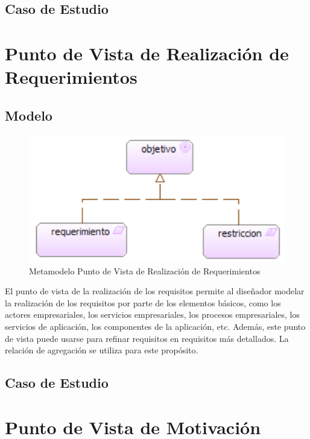 \subsection{Caso de Estudio}

\newpage

\section{Punto de Vista de Realización de Requerimientos}

\subsection{Modelo}

\begin{figure}[th!]
	\centering
	\includegraphics[width=0.5\linewidth]{arquitectura/imagenes/modeloRealizacionRequerimientos}
	\caption{Metamodelo Punto de Vista de Realización de Requerimientos}
	\label{metamodelo realizacion requerimientos}
\end{figure}
El punto de vista de la realización de los requisitos permite al diseñador modelar la realización de los requisitos por parte de los elementos básicos, como los actores empresariales, los servicios empresariales, los procesos empresariales, los servicios de aplicación, los componentes de la aplicación, etc.
Además, este punto de vista puede usarse para refinar requisitos en requisitos más detallados. La relación de agregación se utiliza para este propósito.

\subsection{Caso de Estudio}

\newpage

\section{Punto de Vista de Motivación}

